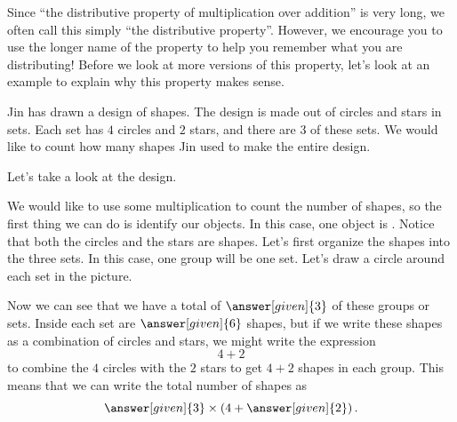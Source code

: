 \documentclass{ximera}
\begin{document}
Since ``the distributive property of multiplication over addition'' is very long, we often call this simply ``the distributive property''. However, we encourage you to use the longer name of the property to help you remember what you are distributing! Before we look at more versions of this property, let's look at an example to explain why this property makes sense.

\begin{example}
Jin has drawn a design of shapes. The design is made out of circles and stars in sets. Each set has $4$ circles and $2$ stars, and there are $3$ of these sets. We would like to count how many shapes Jin used to make the entire design.

Let's take a look at the design.
\begin{image}
\end{image}

We would like to use some multiplication to count the number of shapes, so the first thing we can do is identify our objects. In this case, one object is . Notice that both the circles and the stars are shapes. Let's first organize the shapes into the three sets. In this case, one group will be one set. Let's draw a circle around each set in the picture.

\begin{image}
\end{image}

Now we can see that we have a total of $\answer[given]{3}$ of these groups or sets. Inside each set are $\answer[given]{6}$ shapes, but if we write these shapes as a combination of circles and stars, we might write the expression
\[
4 + 2
\]
to combine the $4$ circles with the $2$ stars to get $4+2$ shapes in each group. This means that we can write the total number of shapes as
\[
\answer[given]{3} \times \left (4 + \answer[given]{2} \right ).
\]


\end{example}
\end{document}
